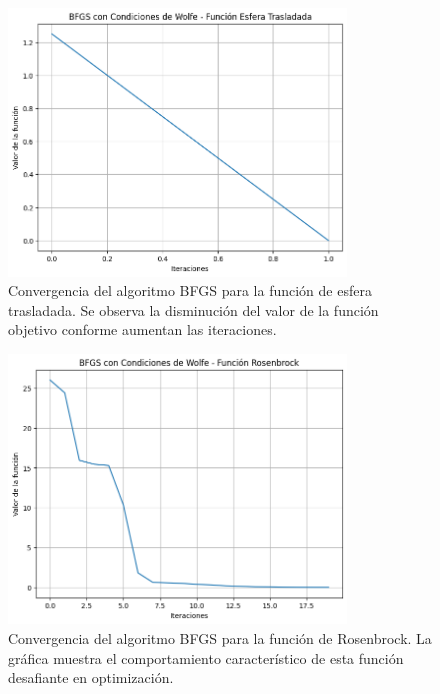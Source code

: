 \documentclass{article}
\begin{document}
\begin{figure}[H]
    \centering
    \includegraphics[width=0.8\textwidth]{images/5_sphere.png}
    \caption{Convergencia del algoritmo BFGS para la función de esfera trasladada. Se observa la disminución del valor de la función objetivo conforme aumentan las iteraciones.}
\end{figure}

\begin{figure}[H]
    \centering
    \includegraphics[width=0.8\textwidth]{images/5_rosenbrock.png}
    \caption{Convergencia del algoritmo BFGS para la función de Rosenbrock. La gráfica muestra el comportamiento característico de esta función desafiante en optimización.}
\end{figure}
\end{document}
